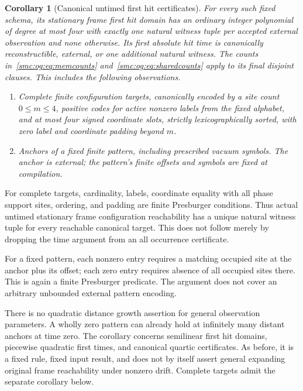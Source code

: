 \documentclass[11pt,letterpaper]{article}
\numberwithin{equation}{section}
\newtheorem{corollary}[theorem]{Corollary}
\theoremstyle{definition}
\theoremstyle{remark}
\begin{document}
\begin{corollary}[Canonical untimed first hit certificates]\label{smc:og:cor:firsthit}
For every such fixed schema, its stationary frame first hit domain has an ordinary integer polynomial of degree at most four with exactly one natural witness tuple per accepted external observation and none otherwise. Its first absolute hit time is canonically reconstructible, external, or one additional natural witness. The counts in~\eqref{smc:og:eq:memcounts} and~\eqref{smc:og:eq:sharedcounts} apply to its final disjoint clauses. This includes the following observations.
\begin{enumerate}
\item Complete finite configuration targets, canonically encoded by a site count $0\le m\le4$, positive codes for active nonzero labels from the fixed alphabet, and at most four signed coordinate slots, strictly lexicographically sorted, with zero label and coordinate padding beyond $m$.
\item Anchors of a fixed finite pattern, including prescribed vacuum symbols. The anchor is external; the pattern's finite offsets and symbols are fixed at compilation.
\end{enumerate}
\end{corollary}
For complete targets, cardinality, labels, coordinate equality with all phase support sites, ordering, and padding are finite Presburger conditions. Thus actual untimed stationary frame configuration reachability has a unique natural witness tuple for every reachable canonical target. This does not follow merely by dropping the time argument from an all occurrence certificate.

For a fixed pattern, each nonzero entry requires a matching occupied site at the anchor plus its offset; each zero entry requires absence of all occupied sites there. This is again a finite Presburger predicate. The argument does not cover an arbitrary unbounded external pattern encoding.

There is no quadratic distance growth assertion for general observation parameters. A wholly zero pattern can already hold at infinitely many distant anchors at time zero. The corollary concerns semilinear first hit domains, piecewise quadratic first times, and canonical quartic certificates. As before, it is a fixed rule, fixed input result, and does not by itself assert general expanding original frame reachability under nonzero drift. Complete targets admit the separate corollary below.
\end{document}
